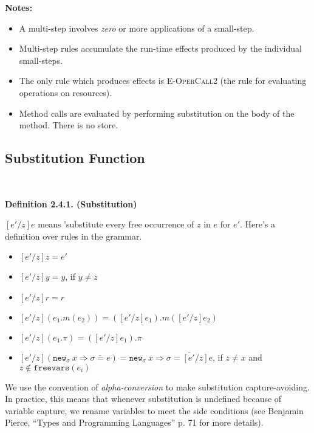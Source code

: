 \documentclass{llncs}
\newcommand{\keywadj}[1]{\mathtt{#1}}
\newcommand{\newsig}[0]{
	\keywadj{new}_\sigma~x \Rightarrow \overline{\sigma = e}
}
\begin{document}
\noindent \textbf{Notes:}
\begin{itemize}
	\item A multi-step involves \textit{zero} or more applications of a small-step.
	\item Multi-step rules accumulate the run-time effects produced by the individual small-steps.
	\item The only rule which produces effects is \textsc{E-OperCall2} (the rule for evaluating operations on resources).
	\item Method calls are evaluated by performing substitution on the body of the method. There is no store.
\end{itemize}






\subsection{Substitution Function}

~
\begin{large}
	\bf{Definition 2.4.1. (Substitution)}
\end{large}

$[e'/z]e$ means 'substitute every free occurrence of $z$ in $e$ for $e'$. Here's a definition over rules in the grammar.

\begin{itemize}
	\item $[e'/z]z = e'$
	\item $[e'/z]y = y$, if $y \neq z$
	\item $[e'/z]r = r$
	\item $[e'/z](e_1.m(e_2)) = ([e'/z]e_1).m([e'/z]e_2)$
	\item $[e'/z](e_1.\pi) = ([e'/z]e_1).\pi$
	\item $[e'/z](\newsig) = \keywadj{new}_\sigma~x \Rightarrow \overline{ \sigma = [e'/z]e }$, if $z \neq x$ and $z \notin \keywadj{freevars}(e_i)$
\end{itemize}

\noindent
We use the convention of \textit{alpha-conversion} to make substitution capture-avoiding. In practice, this means that whenever substitution is undefined because of variable capture, we rename variables to meet the side conditions (see Benjamin Pierce, ``Types and Programming Languages'' p. 71 for more details). \\
\end{document}
